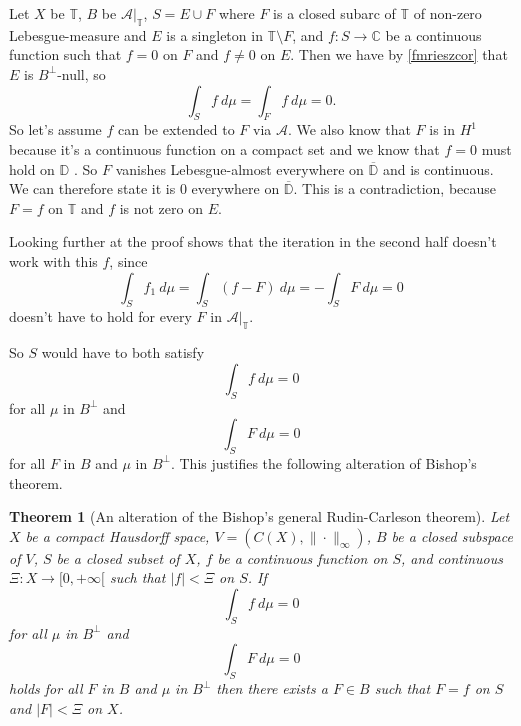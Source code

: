\documentclass[a4paper,12pt,twoside,BCOR=10mm]{scrbook}
\newtheorem{theorem}{Theorem}[section]
\theoremstyle{definition}
\theoremstyle{definition}
\theoremstyle{definition}
\begin{document}
Let
	$X$ be $\mathbb{T}$,
	$B$ be $\mathcal{A}|_{\mathbb{T}}$,
	$S = E \cup F$ where $F$ is a closed subarc of $\mathbb{T}$ of non-zero Lebesgue-measure and $E$ is a singleton in $\mathbb{T} \setminus F$,
	and $f: S \rightarrow \mathbb{C}$ be a continuous function such that $f = 0$ on $F$ and $f \neq 0$ on $E$.
Then we have by \ref{fmrieszcor} that $E$ is $B^{\bot}$-null, so
\[
	\int_S f\ d\mu = \int_F f\ d\mu = 0.
\]
So let's assume $f$ can be extended to $F$ via $\mathcal{A}$.
We also know that $F$ is in $H^1$ because it's a continuous function on a compact set and we know that $f = 0$ must hold on $\mathbb{D}$
\citep[Theorem $13.4.11$]{greenkrantz}.
So $F$ vanishes Lebesgue-almost everywhere on $\overline{\mathbb{D}}$ and is continuous.
We can therefore state it is $0$ everywhere on $\overline{\mathbb{D}}$.
This is a contradiction, because $F = f$ on $\mathbb{T}$ and $f$ is not zero on $E$.

Looking further at the proof shows that the iteration in the second half doesn't work with this $f$, since 
\[
	\int_S f_1\ d\mu = \int_S (f - F)\ d\mu = -\int_S F\ d\mu = 0
\]
doesn't have to hold for every $F$ in $\mathcal{A}|_{\mathbb{T}}$.

So $S$ would have to both satisfy
\[
	\int_S f\ d\mu = 0
\]
for all $\mu$ in $B^{\bot}$ and
\[
	\int_S F\ d\mu = 0
\]
for all $F$ in $B$ and $\mu$ in $B^{\bot}$.
This justifies the following alteration of Bishop's theorem.
\begin{theorem}[An alteration of the Bishop's general Rudin-Carleson theorem]
Let $X$ be a compact Hausdorff space,
	$V = (C(X), \| \cdot \|_{\infty})$,
	$B$ be a closed subspace of $V$,
	$S$ be a closed subset of $X$,
	$f$ be a continuous function on $S$,
	and continuous $\Xi: X \rightarrow [0, +\infty[$ such that $|f| < \Xi$ on $S$.
If
\[
	\int_S f\ d\mu = 0
\]
for all $\mu$ in $B^{\bot}$ and
\[
	\int_S F\ d\mu = 0
\]
holds for all $F$ in $B$ and $\mu$ in $B^{\bot}$ then there exists a $F \in B$ such that $F = f$ on $S$ and $|F| < \Xi$ on $X$.
\end{theorem}

\newcommand{\indexitem}[2]
{
{\bfseries #1} \hfill Page \pageref{#2}\\
}
\end{document}
